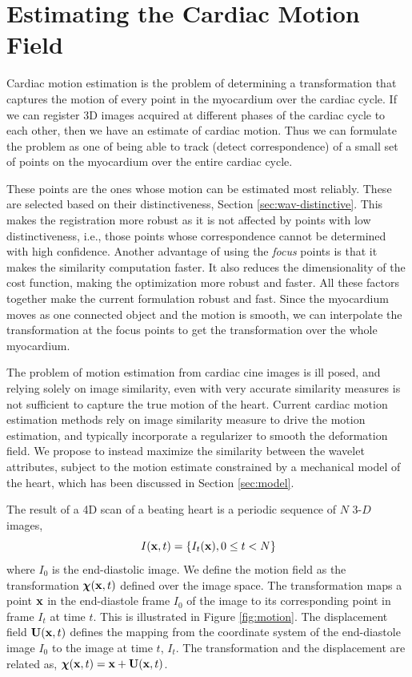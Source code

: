 \section{Estimating the Cardiac Motion Field}
\label{sec:CarMot}

Cardiac motion estimation is the problem of determining a transformation that captures the motion of every point in the myocardium over the cardiac cycle. If we can register 3D images acquired at different phases of the cardiac cycle to each other, then we have an estimate of cardiac motion. Thus we can formulate the problem as one of being able to track (detect correspondence) of a small set of points on the myocardium over the entire cardiac cycle. 

These points are the ones whose motion can be estimated most reliably. These are selected based on their distinctiveness, Section \ref{sec:wav-distinctive}. This makes the registration more robust as it is not affected by points with low distinctiveness, i.e., those points whose correspondence cannot be determined with high confidence. Another advantage of using the {\em focus} points is that it makes the similarity computation faster. It also reduces the dimensionality of the cost function, making the optimization more robust and faster. All these factors together make the current formulation robust and fast. 
Since the myocardium moves as one connected object and the motion is smooth, we can interpolate the transformation at the focus points to get the transformation over the whole myocardium. 

The problem of motion estimation from cardiac cine images is ill posed, and relying solely on image similarity, even with very accurate similarity measures is not sufficient to capture the true motion of the heart. Current cardiac motion estimation methods rely on image similarity measure to drive the motion estimation, and typically incorporate a regularizer to smooth the deformation field. We propose to instead maximize the similarity between the wavelet attributes, subject to the motion estimate constrained by a mechanical model of the heart, which has been discussed in Section \ref{sec:model}.

The result of a 4D scan of a beating heart is a periodic sequence of $N$ 3-$D$ images,
\[
I(\mathbf{x},t) = \{I_t(\mathbf{x}), 0\le t < N\}
\] 
where $I_0$ is the end-diastolic image. We define the motion field as the transformation ${\boldsymbol{\chi}} ( \mathbf{x}, t )$ defined over the image space. The transformation maps a point $\mathbf{x}$ in the end-diastole frame $I_0$ of the image to its corresponding point in frame $I_t$ at time $t$. This is illustrated in Figure \ref{fig:motion}. The displacement field $\mathbf{U}( \mathbf{x}, t )$  defines the mapping from the coordinate system of the end-diastole image $I_0$ to the image at time $t$, $I_t$. The transformation and the displacement are related as, ${\boldsymbol{\chi}}( \mathbf{x} ,t ) = \mathbf{x} + \mathbf{U}( \mathbf{x}, t)$.

